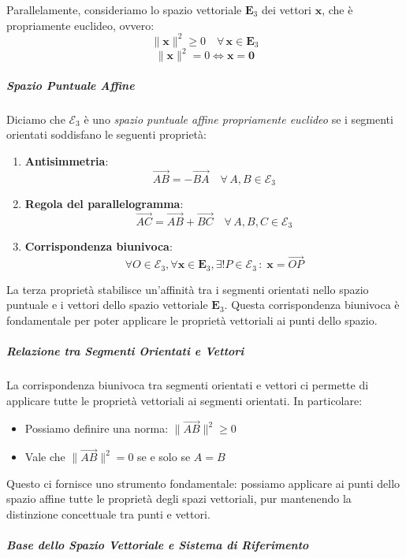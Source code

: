 \documentclass{article}
\theoremstyle{plain}
\theoremstyle{definition}
\theoremstyle{remark}
\begin{document}
Parallelamente, consideriamo lo spazio vettoriale $\mathbf{E}_3$ dei vettori $\mathbf{x}$, che è propriamente euclideo, ovvero:
\[ \|\mathbf{x}\|^2 \geq 0 \quad \forall\,\mathbf{x}\in\mathbf{E}_3 \]
\[ \|\mathbf{x}\|^2 = 0 \iff \mathbf{x}=\mathbf{0} \]

\subparagraph{Spazio Puntuale Affine}

Diciamo che $\mathcal{E}_3$ è uno \emph{spazio puntuale affine propriamente euclideo} se i segmenti orientati soddisfano le seguenti proprietà:

\begin{enumerate}
    \item \textbf{Antisimmetria}: 
    \[ \overrightarrow{AB}=-\overrightarrow{BA} \quad \forall\,A,B\in\mathcal{E}_3 \]
    
    \item \textbf{Regola del parallelogramma}: 
    \[ \overrightarrow{AC}=\overrightarrow{AB}+\overrightarrow{BC} \quad \forall\,A,B,C\in\mathcal{E}_3 \]
    
    \item \textbf{Corrispondenza biunivoca}: 
    \[ \forall O\in\mathcal{E}_3,\forall\mathbf{x}\in\mathbf{E}_3, \exists!P\in\mathcal{E}_3\,:\;\mathbf{x}=\overrightarrow{OP} \]
\end{enumerate}

La terza proprietà stabilisce un'affinità tra i segmenti orientati nello spazio puntuale e i vettori dello spazio vettoriale $\mathbf{E}_3$. Questa corrispondenza biunivoca è fondamentale per poter applicare le proprietà vettoriali ai punti dello spazio.

\subparagraph{Relazione tra Segmenti Orientati e Vettori}

La corrispondenza biunivoca tra segmenti orientati e vettori ci permette di applicare tutte le proprietà vettoriali ai segmenti orientati. In particolare:

\begin{itemize}
    \item Possiamo definire una norma: $\|\overrightarrow{AB}\|^2 \geq 0$
    \item Vale che $\|\overrightarrow{AB}\|^2 = 0$ se e solo se $A = B$
\end{itemize}

Questo ci fornisce uno strumento fondamentale: possiamo applicare ai punti dello spazio affine tutte le proprietà degli spazi vettoriali, pur mantenendo la distinzione concettuale tra punti e vettori.

\subparagraph{Base dello Spazio Vettoriale e Sistema di Riferimento}
\end{document}
